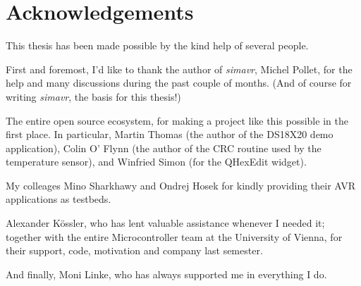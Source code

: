 \chapter{Acknowledgements} \label{chapter:acknowledgements}

This thesis has been made possible by the kind help of several people.

First and foremost, I'd like to thank the author of \emph{simavr}, Michel Pollet, for
the help and many discussions during the past couple of months. (And of course
for writing \emph{simavr}, the basis for this thesis!)

The entire open source ecosystem, for making a project like this possible in the
first place. In particular, Martin Thomas (the author of the DS18X20 demo
application), Colin O' Flynn (the author of the CRC routine used by the
temperature sensor), and Winfried Simon (for the QHexEdit widget).

My colleages Mino Sharkhawy and Ondrej Hosek for kindly providing their AVR
applications as testbeds.

Alexander K\"ossler, who has lent valuable assistance whenever I needed it;
together with the entire Microcontroller team at the University of Vienna, for
their support, code, motivation and company last semester.

And finally, Moni Linke, who has always supported me in everything I do.